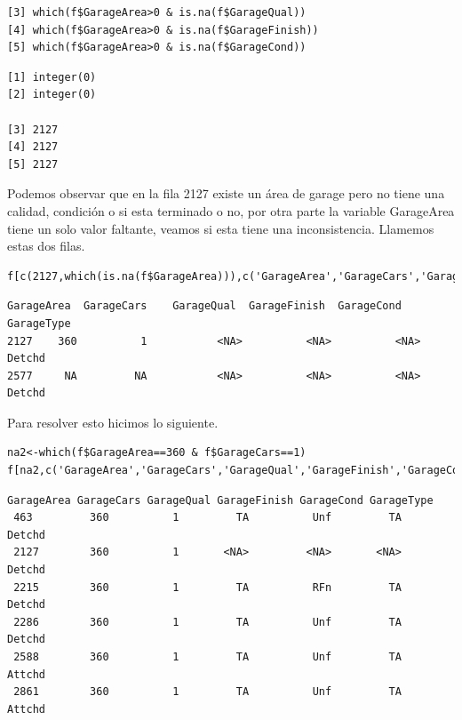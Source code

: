 \documentclass{report}
\begin{document}
\begin{itemize}
\begin{itemize}
\begin{itemize}
\begin{lstlisting}[frame=single]
[3] which(f$GarageArea>0 & is.na(f$GarageQual))
[4] which(f$GarageArea>0 & is.na(f$GarageFinish))
[5] which(f$GarageArea>0 & is.na(f$GarageCond))
\end{lstlisting}

\begin{lstlisting}[frame=single]
[1] integer(0)
[2] integer(0)

[3] 2127
[4] 2127
[5] 2127
\end{lstlisting}
\vspace{2mm}

Podemos observar que en la fila 2127 existe un área de garage pero no tiene una calidad, condición o si esta terminado o no, por otra parte la variable GarageArea tiene un solo valor faltante, veamos si esta tiene una inconsistencia. Llamemos estas dos filas.\\

\begin{lstlisting}[frame=single]
f[c(2127,which(is.na(f$GarageArea))),c('GarageArea','GarageCars','GarageQual','GarageFinish','GarageCond','GarageType')]
\end{lstlisting}

\begin{lstlisting}[frame=single]
      GarageArea  GarageCars    GarageQual  GarageFinish  GarageCond  GarageType
2127    360          1           <NA>          <NA>          <NA>       Detchd
2577     NA         NA           <NA>          <NA>          <NA>       Detchd
\end{lstlisting}
\vspace{2mm}

Para resolver esto hicimos lo siguiente.\\

\begin{lstlisting}[frame=single]
na2<-which(f$GarageArea==360 & f$GarageCars==1)
f[na2,c('GarageArea','GarageCars','GarageQual','GarageFinish','GarageCond','GarageType')]
\end{lstlisting}

\begin{lstlisting}[frame=single]
        GarageArea GarageCars GarageQual GarageFinish GarageCond GarageType
 463         360          1         TA          Unf         TA     Detchd
 2127        360          1       <NA>         <NA>       <NA>     Detchd
 2215        360          1         TA          RFn         TA     Detchd
 2286        360          1         TA          Unf         TA     Detchd
 2588        360          1         TA          Unf         TA     Attchd
 2861        360          1         TA          Unf         TA     Attchd
\end{lstlisting}
\vspace{2mm}


\end{itemize}
\end{itemize}
\end{itemize}
\end{document}
